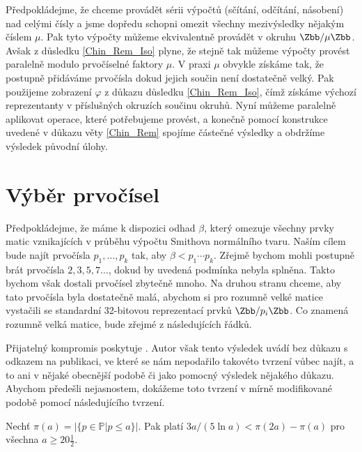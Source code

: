 Předpokládejme, že chceme provádět sérii výpočtů (sčítání, odčítání,
násobení) nad celými čísly a jsme dopředu schopni omezit všechny mezivýsledky nějakým číslem
$ \mu $. Pak tyto výpočty můžeme ekvivalentně provádět v okruhu $ \Zbb / \mu \Zbb $.
Avšak z důsledku \ref{Chin_Rem_Iso} plyne, že stejně tak můžeme výpočty provést
paralelně modulo prvočíselné faktory $ \mu $. V praxi $ \mu $ obvykle získáme tak,
že postupně přidáváme prvočísla dokud jejich součin není dostatečně velký.
Pak použijeme zobrazení $ \varphi $ z důkazu důsledku \ref{Chin_Rem_Iso},
čímž získáme výchozí reprezentanty v příslušných okruzích součinu okruhů.
Nyní můžeme paralelně aplikovat operace, které potřebujeme provést, a konečně
pomocí konstrukce uvedené v důkazu věty \ref{Chin_Rem} spojíme částečné výsledky
a obdržíme výsledek původní úlohy.




\section{Výběr prvočísel}
Předpokládejme, že máme k dispozici odhad $ \beta $, který omezuje všechny
prvky matic vznikajících v průběhu výpočtu Smithova normálního tvaru. Naším cílem bude
najít prvočísla $ p_1,\dots, p_k $ tak, aby $ \beta < p_1 \cdots p_k $. Zřejmě
bychom mohli postupně brát prvočísla $ 2, 3, 5, 7 \dots $, dokud by uvedená
podmínka nebyla splněna. Takto bychom však dostali prvočísel zbytečně mnoho. Na
druhou stranu chceme, aby tato prvočísla byla dostatečně malá, abychom
si pro rozumně velké matice vystačili se standardní 32-bitovou reprezentací
prvků $ \Zbb / p_i \Zbb $. Co znamená rozumně velká matice, bude zřejmé z 
následujících řádků.

Přijatelný kompromis poskytuje \cite[Lemma 14]{triang}. Autor však tento výsledek
uvádí bez důkazu s odkazem na publikaci, ve které se nám nepodařilo takovéto
tvrzení vůbec najít, a to ani v nějaké obecnější podobě či jako pomocný výsledek
nějakého důkazu. Abychom předešli nejasnostem, dokážeme toto tvrzení v mírně
modifikované podobě pomocí následujícího tvrzení.


\begin{lem} \label{num_primes_src}
Nechť $ \pi(a) = \left\vert \{ p \in \mathbb{P} \vert p \leq a \} \right\vert $. Pak
platí $ 3a / (5 \ln{a}) < \pi(2a) - \pi(a) $ pro všechna $ a \geq 20 \frac{1}{2} $.
\end{lem}

